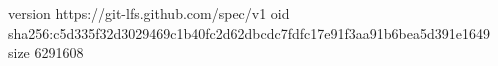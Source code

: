 version https://git-lfs.github.com/spec/v1
oid sha256:c5d335f32d3029469c1b40fc2d62dbcdc7fdfc17e91f3aa91b6bea5d391e1649
size 6291608
